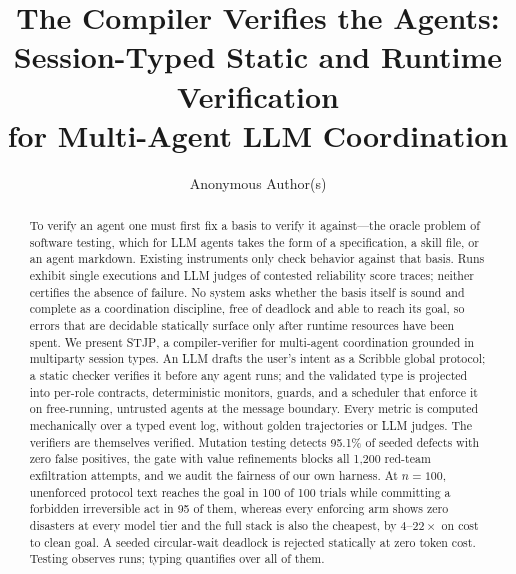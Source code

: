 \documentclass{article}
\title{The Compiler Verifies the Agents:\\ Session-Typed Static and Runtime Verification\\ for Multi-Agent LLM Coordination}
\author{%
  Anonymous Author(s)\\
}
\newcommand{\stjp}{\textsc{STJP}}
\begin{document}
\maketitle

\begin{abstract}
To verify an agent one must first fix a basis to verify it against---the oracle problem of software testing, which for LLM agents takes the form of a specification, a skill file, or an agent markdown. Existing instruments only check behavior against that basis. Runs exhibit single executions and LLM judges of contested reliability score traces; neither certifies the absence of failure. No system asks whether the basis itself is sound and complete as a coordination discipline, free of deadlock and able to reach its goal, so errors that are decidable statically surface only after runtime resources have been spent. We present \stjp{}, a compiler-verifier for multi-agent coordination grounded in multiparty session types. An LLM drafts the user's intent as a Scribble global protocol; a static checker verifies it before any agent runs; and the validated type is projected into per-role contracts, deterministic monitors, guards, and a scheduler that enforce it on free-running, untrusted agents at the message boundary. Every metric is computed mechanically over a typed event log, without golden trajectories or LLM judges. The verifiers are themselves verified. Mutation testing detects 95.1\% of seeded defects with zero false positives, the gate with value refinements blocks all 1{,}200 red-team exfiltration attempts, and we audit the fairness of our own harness. At $n{=}100$, unenforced protocol text reaches the goal in 100 of 100 trials while committing a forbidden irreversible act in 95 of them, whereas every enforcing arm shows zero disasters at every model tier and the full stack is also the cheapest, by $4$--$22\times$ on cost to clean goal. A seeded circular-wait deadlock is rejected statically at zero token cost. Testing observes runs; typing quantifies over all of them.
\end{abstract}
\end{document}
